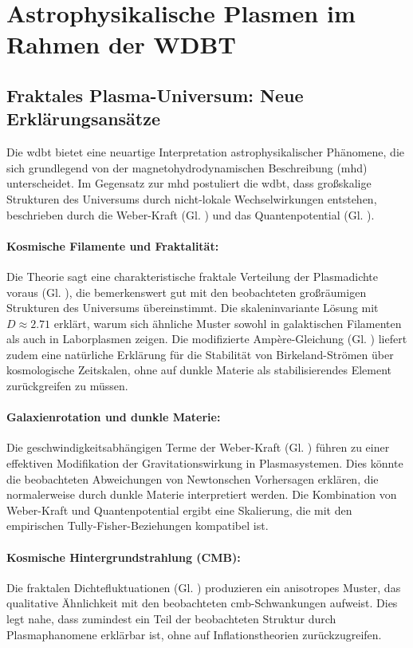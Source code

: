 \chapter{Astrophysikalische Plasmen im Rahmen der WDBT}
\section{Fraktales Plasma-Universum: Neue Erklärungsansätze}
Die \gls{wdbt} bietet eine neuartige Interpretation astrophysikalischer Phänomene, die sich grundlegend von der magnetohydrodynamischen Beschreibung (\gls{mhd}) unterscheidet. Im Gegensatz zur \gls{mhd}
postuliert die \gls{wdbt}, dass großskalige Strukturen des Universums durch nicht-lokale Wechselwirkungen entstehen, beschrieben durch die Weber-Kraft (Gl. ) und das
Quantenpotential (Gl. ).

\subsubsection{Kosmische Filamente und Fraktalität:}
Die Theorie sagt eine charakteristische fraktale Verteilung der Plasmadichte voraus (Gl. ), die bemerkenswert gut mit den beobachteten großräumigen Strukturen des Universums
übereinstimmt. Die skaleninvariante Lösung mit $D \approx 2.71$ erklärt, warum sich ähnliche Muster sowohl in galaktischen Filamenten als auch in Laborplasmen zeigen. Die modifizierte Ampère-Gleichung
(Gl. ) liefert zudem eine natürliche Erklärung für die Stabilität von Birkeland-Strömen über kosmologische Zeitskalen, ohne auf dunkle Materie als stabilisierendes Element
zurückgreifen zu müssen.

\subsubsection{Galaxienrotation und dunkle Materie:}
Die geschwindigkeitsabhängigen Terme der Weber-Kraft (Gl. ) führen zu einer effektiven Modifikation der Gravitationswirkung in Plasmasystemen. Dies könnte die beobachteten
Abweichungen von Newtonschen Vorhersagen erklären, die normalerweise durch dunkle Materie interpretiert werden. Die Kombination von Weber-Kraft und Quantenpotential ergibt eine Skalierung, die mit den
empirischen Tully-Fisher-Beziehungen kompatibel ist.

\subsubsection{Kosmische Hintergrundstrahlung (CMB):}
Die fraktalen Dichtefluktuationen (Gl. ) produzieren ein anisotropes Muster, das qualitative Ähnlichkeit mit den beobachteten \gls{cmb}-Schwankungen aufweist. Dies legt nahe,
dass zumindest ein Teil der beobachteten Struktur durch Plasmaphanomene erklärbar ist, ohne auf Inflationstheorien zurückzugreifen.


